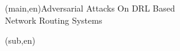 
%




%
%
%
%
\nttitle(main,en){Adversarial Attacks On DRL Based\\Network Routing Systems}%

\nttitle(sub,en){}%



%
%
%
%



